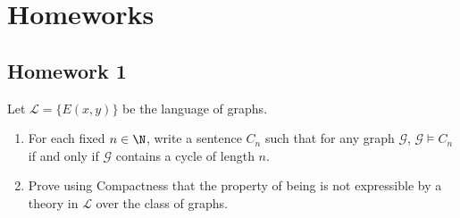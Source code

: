 \documentclass[a4paper, 12pt]{report}
\institute{\curlyquotes{\hspace{0.25mm}Sapienza} Università di Roma}
\subtitle{Appunti integrati con il libro \book}
\author{\textit{Autore}\\\authorName}
\institute{\curlyquotes{\hspace{0.25mm}Sapienza} University of Rome}
\subtitle{Lecture notes integrated with the book \book}
\author{\textit{Author}\\\authorName}
\title{\courseName}
\date{\today}
\begin{document}
    \maketitle

    {
        \hypersetup{allcolors=black}

        \romantableofcontents
    }

    \introduction


    \chapter{Homeworks}

    \section{Homework 1}

    \newpage

     Let $\mathcal L = \{E(x, y)\}$ be the language of graphs.

    \begin{enumerate}
        \item For each fixed $n \in \N$, write a sentence $C_n$ such that for any graph $\mathcal G$, $\mathcal G \models C_n$ if and only if $\mathcal G$ contains a cycle of length $n$.
        \item Prove using Compactness that the property of being  is not expressible by a theory in $\mathcal L$ over the class of graphs.
    \end{enumerate}
\end{document}
